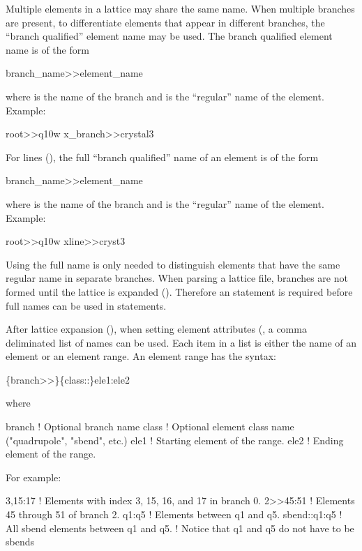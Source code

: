 {{{Multiple elements in a lattice may share the same name.  When multiple branches are present, to
differentiate elements that appear in different branches, the ``branch qualified'' element name may
be used. The branch qualified element name is of the form
\begin{example}
  branch_name>>element_name
\end{example}
where  is the name of the branch and  is the ``regular'' name of
the element. Example:
\begin{example}
  root>>q10w
  x_branch>>crystal3
\end{example}

For  lines (), the full ``branch qualified'' name of an element is of
the form
\begin{example}
  branch_name>>element_name
\end{example}
where  is the name of the branch and  is the ``regular'' name of
the element. Example:
\begin{example}
  root>>q10w
  xline>>cryst3
\end{example}
Using the full name is only needed to distinguish elements that have the same regular name in
separate branches. When parsing a lattice file, branches are not formed until the lattice is
expanded (). Therefore an  statement is required before full names
can be used in statements.

After lattice expansion (), when setting element attributes (, a
comma deliminated list of names can be used. Each item in a list is either the name of an element or
an element range. An element range has the syntax:
\begin{example}
  \{branch>>\}\{class::\}ele1:ele2
\end{example}
where
\begin{example}
  branch   ! Optional branch name
  class    ! Optional element class name ("quadrupole", "sbend", etc.)
  ele1     ! Starting element of the range.
  ele2     ! Ending element of the range. 
\end{example}
For example:
\begin{example}
  3,15:17          ! Elements with index 3, 15, 16, and 17 in branch 0.
  2>>45:51         ! Elements 45 through 51 of branch 2.
  q1:q5            ! Elements between q1 and q5.
  sbend::q1:q5     ! All sbend elements between q1 and q5. 
                   ! Notice that q1 and q5 do not have to be sbends
\end{example}

}}}
